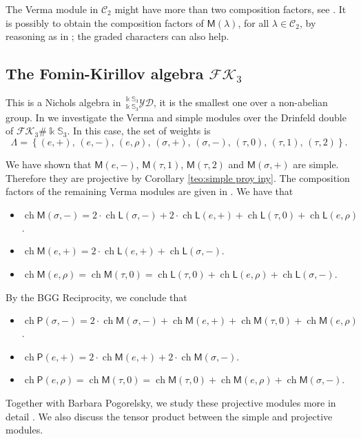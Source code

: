 \documentclass[reqno]{amsart}
\newcommand{\ydstres}{{}^{\ku{\Sn_3}}_{\ku{\Sn_3}}\mathcal{YD}}
\newcommand{\FK}{\mathcal{FK}}
\newcommand{\Sn}{{\mathbb S}}
\renewcommand{\_}[1]{_{\left( #1 \right)}}
\renewcommand{\^}[1]{^{\left( #1 \right)}}
\newcommand{\ku}{\Bbbk}
\newcommand\fL{\mathsf{L}}
\newcommand\fM{\mathsf{M}}
\newcommand\fP{\mathsf{P}}
\newcommand{\ch}{\operatorname{ch}}
\theoremstyle{plain}
\theoremstyle{definition}
\theoremstyle{remark}
\begin{document}
The Verma module in $\mathcal{C}_2$ might have more than two composition factors, see \cite[Remark 3.2]{ufo7}. It is possibly to obtain the composition factors of $\fM(\lambda)$, for all $\lambda\in\mathcal{C}_2$, by reasoning as in \cite[Remark 3.2]{ufo7}; the graded characters can also help. 

\subsection{The Fomin-Kirillov algebra \texorpdfstring{$\mathcal{FK}_3$}{FK3}}

This is a Nichols algebra in $\ydstres$, it is the smallest one over a non-abelian group. In \cite{PV2} we investigate the Verma and simple modules over the Drinfeld double of $\FK_3\#\ku\Sn_3$. In this case, the set of weights is 
$$
\Lambda=\left\{(e,+),\, (e,-),\, (e,\rho),\, (\sigma,+),\, (\sigma,-),\, (\tau,0),\, (\tau,1),\, (\tau,2)\right\}. 
$$

We have shown that $\fM(e,-)$, $\fM(\tau,1)$, $\fM(\tau,2)$ and $\fM(\sigma,+)$ are simple. Therefore they are projective by Corollary \ref{teo:simple proy iny}. The composition factors of the remaining Verma modules are given in \cite[Theorems 7, 8, 9 and 10]{PV2}. We have that
\begin{itemize}
 \item $\ch\fM(\sigma,-)=2\cdot\ch\fL(\sigma,-)+2\cdot\ch\fL(e,+)+\ch\fL(\tau,0)+\ch\fL(e,\rho)$.
 \smallskip
 \item $\ch\fM(e,+)=2\cdot\ch\fL(e,+)+\ch\fL(\sigma,-)$.
 \smallskip
 \item $\ch\fM(e,\rho)=\ch\fM(\tau,0)=\ch\fL(\tau,0)+\ch\fL(e,\rho)+\ch\fL(\sigma,-)$.
\end{itemize}
By the BGG Reciprocity, we conclude that
\begin{itemize}
 \item $\ch\fP(\sigma,-)=2\cdot\ch\fM(\sigma,-)+\ch\fM(e,+)+\ch\fM(\tau,0)+\ch\fM(e,\rho)$.
 \smallskip
 \item $\ch\fP(e,+)=2\cdot\ch\fM(e,+)+2\cdot\ch\fM(\sigma,-)$.
 \smallskip
 \item $\ch\fP(e,\rho)=\ch\fM(\tau,0)=\ch\fM(\tau,0)+\ch\fM(e,\rho)+\ch\fM(\sigma,-)$.
\end{itemize}

Together with Barbara Pogorelsky, we study these projective modules more in detail \cite{PV-in-preparation}. We also discuss the tensor product between the simple and projective modules.


{}

\end{document}
